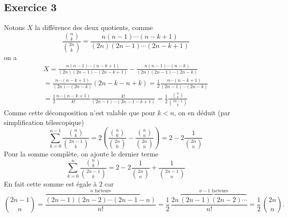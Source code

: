 \subsection*{Exercice 3}
Notons $X$ la différence des deux quotients, comme
\begin{displaymath}
\frac{\binom{n}{k}}{ \binom{2n}{k}}=\frac{n(n-1)\cdots(n-k+1)}{(2n)(2n-1)\cdots(2n-k+1)}
\end{displaymath}
on a
\begin{multline*}
X = \frac{n(n-1)\cdots(n-k+1)}{(2n)(2n-1)\cdots(2n-k+1)}-\frac{n(n-1)\cdots(n-k)}{(2n)(2n-1)\cdots(2n-k)}\\
  = \frac{n\cdots(n-k+1)}{ (2n)\cdots(2n-k)}(2n-k-n+k) 
  = \frac{1}{2}\frac{n\cdots(n-k+1)}{ (2n-1)\cdots(2n-k)}\\
  = \frac{1}{2}\frac{n\cdots(n-k+1)}{ k!} \frac{k!}{ (2n-1)\cdots(2n-1-k+1)} 
  = \frac{1}{2}\frac{\binom{n}{k}}{\binom{2n-1}{k}}
\end{multline*}
Comme cette décomposition n'est valable que pour $k<n$, on en déduit (par simplification télescopique)
\begin{displaymath}
\sum _{k=0}^{n-1}\frac{\binom{n}{k}}{\binom{2n-1}{k}}
= 2\left(\frac{\binom{n}{0}}{\binom{2n}{0}}-\frac{\binom{n}{n}}{\binom{2n}{n}}\right) 
= 2 - 2\frac{1}{\binom{2n}{n}}
\end{displaymath}
Pour la somme complète, on ajoute le dernier terme
\begin{displaymath}
\sum _{k=0}^{n}\frac{\binom{n}{k}}{\binom{2n-1}{k}} = 2 - 2\frac{1}{\binom{2n}{n}} + \frac{1}{\binom{2n-1}{n}}
\end{displaymath}
En fait cette somme est égale à $2$ car
\begin{displaymath}
 \binom{2n-1}{n} = \frac{\overset{n \text{ facteurs}}{\overbrace{(2n-1)(2n-2)\cdots (2n-1-n)}}}{n!}
 = \frac{1}{2}\,\frac{2n\,\overset{n-1 \text{ facteurs}}{\overbrace{(2n-1)(2n-2)\cdots}}}{n!}
 = \frac{1}{2}\,\binom{2n}{n}.
\end{displaymath}
